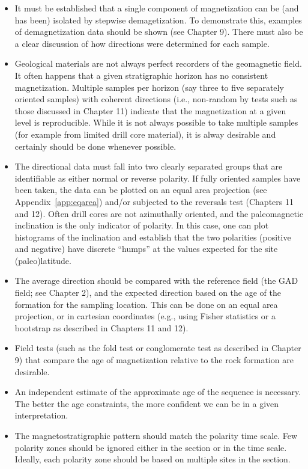 \begin{itemize}
\item It must be established that a single component of magnetization can
be (and has been) isolated by stepwise demagetization.  To demonstrate this,
 examples of demagnetization
data should be shown (see Chapter 9).  There must also be
  a clear discussion of how directions were determined for each sample.

\item Geological materials are not always perfect recorders of the geomagnetic field.
It often happens that a given stratigraphic horizon has no consistent magnetization.
Multiple samples per horizon  (say three to five separately oriented samples)
with coherent directions (i.e., non-random by tests such as those discussed in 
Chapter 11)
indicate that the magnetization at a given level is reproducible. While it is not
always possible to take multiple samples (for example from limited drill core material),
it is alway desirable and certainly should be done whenever possible.

\item  The directional data must fall into two clearly separated groups
that are identifiable as either normal or 
reverse polarity.  If fully oriented samples have been
taken, the data can be plotted on an equal area projection
(see Appendix~\ref{app:eqarea}) and/or subjected to the
reversals test (Chapters 11 and 12).  Often drill cores are not azimuthally oriented,
and the paleomagnetic inclination is the only indicator of polarity.
 In this case, one can plot histograms of the inclination and establish that the two polarities (positive and negative) have discrete
``humps'' at the values expected for the site (paleo)latitude.

\item The average direction should be compared with the reference field
(the GAD field; see Chapter 2), and the expected direction based on the age 
of the formation for the
sampling location.  This can be done on an equal area projection, or in cartesian 
coordinates (e.g., using  Fisher statistics or a bootstrap as described in Chapters 11 and 12).   

\item  Field tests (such as the fold test or conglomerate test as
described in Chapter 9) that compare the age of magnetization relative to the
rock formation are desirable.

\item An independent estimate of the approximate age of the sequence is
necessary.  The better the age constraints, 
the more confident we can be in a given interpretation.

\item The magnetostratigraphic pattern should match the polarity time scale.
 Few polarity zones should be ignored either in the
section or in the time scale.  Ideally, each polarity zone should be
based on multiple sites in the section. 
\end{itemize}


